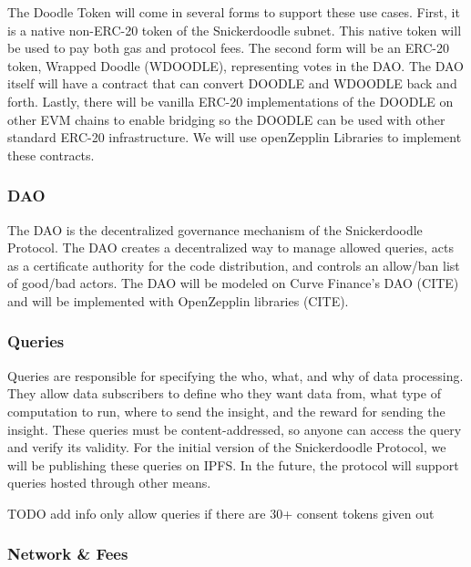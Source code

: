 The Doodle Token will come in several forms to support these use cases. First, it is a native non-ERC-20 token of the Snickerdoodle subnet. This native 
token will be used to pay both gas and protocol fees. The second form will be an ERC-20 token, Wrapped Doodle (WDOODLE), representing votes in the DAO. 
The DAO itself will have a contract that can convert DOODLE and WDOODLE back and forth. Lastly, there will be vanilla ERC-20 implementations of the DOODLE 
on other EVM chains to enable bridging so the DOODLE can be used with other standard ERC-20 infrastructure. We will use openZepplin Libraries to implement 
these contracts. 


\subsubsection{DAO}
\label{section:ImplementationDAO}
The DAO is the decentralized governance mechanism of the Snickerdoodle Protocol. The DAO creates a decentralized way to manage allowed queries, acts as a 
certificate authority for the code distribution, and controls an allow/ban list of good/bad actors. The DAO will be modeled on Curve Finance's DAO (CITE) 
and will be implemented with OpenZepplin libraries (CITE). 

\subsubsection{Queries}
Queries are responsible for specifying the who, what, and why of data processing. They allow data subscribers to define who they want data from, what type 
of computation to run, where to send the insight, and the reward for sending the insight. These queries must be content-addressed, so anyone can access the 
query and verify its validity. For the initial version of the Snickerdoodle Protocol, we will be publishing these queries on IPFS. In the future, the protocol 
will support queries hosted through other means.

TODO add info only allow queries if there are 30+ consent tokens given out

\subsubsection{Network \& Fees}

